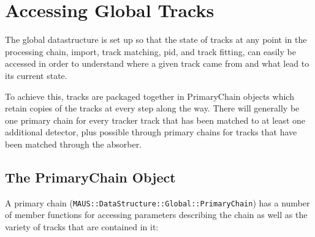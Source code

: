 \chapter{Accessing Global Tracks}
\label{chapter:globalds}

The global datastructure is set up so that the state of tracks at any point in the processing chain, import,
track matching, pid, and track fitting, can easily be accessed in order to understand where a given track
came from and what lead to its current state.

To achieve this, tracks are packaged together in PrimaryChain objects which retain copies of the
tracks at every step along the way. There will generally be one primary chain for every tracker track that
has been matched to at least one additional detector, plus possible through primary chains for tracks
that have been matched through the absorber.

\section{The PrimaryChain Object}\label{sec:primarychain}

A primary chain (\texttt{MAUS::DataStructure::Global::PrimaryChain}) has a number of member functions
for accessing parameters describing the chain as well as the variety of tracks that are contained in it:

